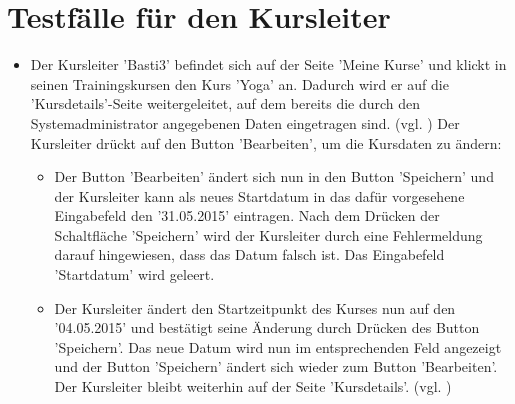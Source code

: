 \documentclass[a4paper]{scrreprt}
\newcounter{Lc}
\newcounter{Hc}
\newcommand{\stepHc}{\stepcounter{Hc}\setcounter{Lc}{0}}
\begin{document}
	\section{Testfälle für den Kursleiter}
		\stepHc
		\begin{itemize}
			\item {} 
			 Der Kursleiter 'Basti3' befindet sich auf der Seite 'Meine Kurse' und klickt in seinen Trainingskursen den Kurs 'Yoga' an. Dadurch wird er auf die 'Kursdetails'-Seite weitergeleitet, auf dem bereits die durch den Systemadministrator angegebenen Daten eingetragen sind. (vgl. ) Der Kursleiter drückt auf den Button 'Bearbeiten', um die Kursdaten zu ändern:
				\begin{itemize}
					\item Der Button 'Bearbeiten' ändert sich nun in den Button 'Speichern' und der Kursleiter kann als neues Startdatum in das dafür vorgesehene Eingabefeld den '31.05.2015' eintragen. Nach dem Drücken der Schaltfläche 'Speichern' wird der Kursleiter durch eine Fehlermeldung darauf hingewiesen, dass das Datum falsch ist. Das Eingabefeld 'Startdatum' wird geleert.
					
				 	\item Der Kursleiter ändert den Startzeitpunkt des Kurses nun auf den '04.05.2015' und bestätigt seine Änderung durch Drücken des Button 'Speichern'. Das neue Datum wird nun im entsprechenden Feld angezeigt und der Button 'Speichern' ändert sich wieder zum Button 'Bearbeiten'. Der Kursleiter bleibt weiterhin auf der Seite 'Kursdetails'. (vgl. )
				\end{itemize}
				

\end{itemize}
\end{document}
